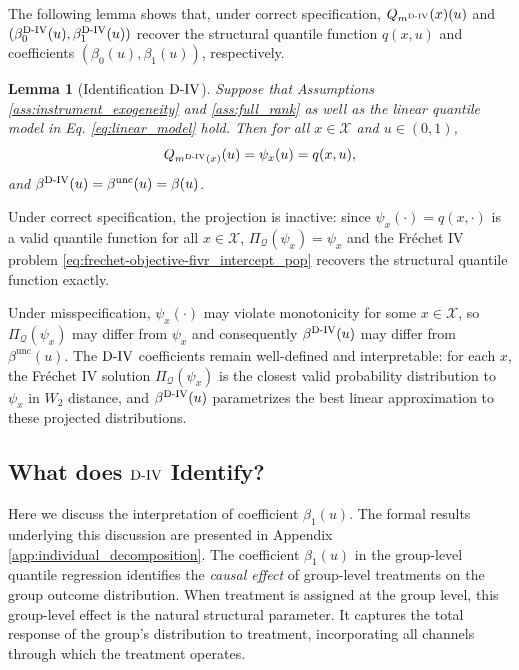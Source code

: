 \documentclass[12pt]{article}
\newcommand{\est}{\ensuremath{\textnormal{D-IV}}\xspace}
\newtheorem{lemma}{Lemma}
\begin{document}
The following lemma shows that, under correct specification, $Q_{m^\est}(x)(u)$ and $(\beta^\est_0(u), \beta^\est_1(u))$ recover the structural quantile function $q(x,u)$ and coefficients $(\beta_0(u), \beta_1(u))$, respectively. 

\begin{lemma}[Identification \est]\label{lem:identification_FIVR}
Suppose that Assumptions \ref{ass:instrument_exogeneity} and \ref{ass:full_rank} 
as well as the linear quantile model in Eq. \eqref{eq:linear_model} hold. Then 
for all $x \in \mathcal{X}$ and $u \in (0,1)$,
\[
Q_{m^{\est}(x)}(u) = \psi_x(u) = q(x,u),
\]
and $\beta^{\est}(u) = \beta^{\text{unc}}(u) = \beta(u)$.
\end{lemma}

Under correct specification, the projection is inactive: since 
$\psi_x(\cdot) = q(x, \cdot)$ is a valid quantile function for all 
$x \in \mathcal{X}$, $\Pi_{\mathcal{Q}}(\psi_x) = \psi_x$ and the 
Fr\'echet IV problem \eqref{eq:frechet-objective-fivr_intercept_pop} 
recovers the structural quantile function exactly. 

Under misspecification, $\psi_x(\cdot)$ may violate monotonicity for some 
$x \in \mathcal{X}$, so $\Pi_{\mathcal{Q}}(\psi_x)$ may differ from $\psi_x$ 
and consequently $\beta^{\est}(u)$ may differ from $\beta^{\text{unc}}(u)$. The 
\est coefficients remain well-defined and interpretable: for each $x$, the 
Fr\'echet IV solution $\Pi_{\mathcal{Q}}(\psi_x)$ is the closest valid probability 
distribution to $\psi_x$ in $W_2$ distance, and $\beta^{\est}(u)$ parametrizes the 
best linear approximation to these projected distributions. 


\subsection{What does \est Identify?}
\label{sec:identification_interpretation}

Here we discuss the interpretation of coefficient $\beta_1(u)$. The formal results underlying this discussion are presented in Appendix \ref{app:individual_decomposition}. The coefficient $\beta_1(u)$ in the group-level quantile regression identifies the \emph{causal effect} of group-level treatments on the group outcome distribution. When treatment is assigned at the group level, this group-level effect is the natural structural parameter. It captures the total response of the group’s distribution to treatment, incorporating all channels through which the treatment operates.
\end{document}

